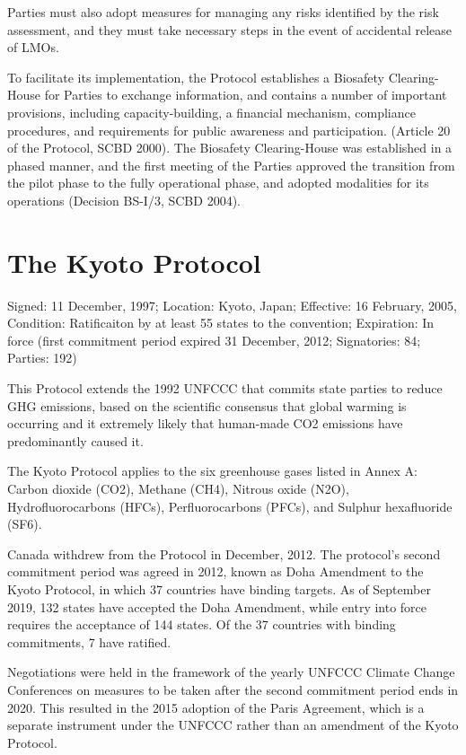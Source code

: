 \documentclass[]{book}
\begin{document}
Parties must also adopt measures for managing any risks identified by the risk assessment, and they must take necessary steps in the event of accidental release of LMOs.

To facilitate its implementation, the Protocol establishes a Biosafety Clearing-House for Parties to exchange information, and contains a number of important provisions, including capacity-building, a financial mechanism, compliance procedures, and requirements for public awareness and participation. (Article 20 of the Protocol, SCBD 2000). The Biosafety Clearing-House was established in a phased manner, and the first meeting of the Parties approved the transition from the pilot phase to the fully operational phase, and adopted modalities for its operations (Decision BS-I/3, SCBD 2004).

\hypertarget{the-kyoto-protocol}{%
\section{The Kyoto Protocol}\label{the-kyoto-protocol}}

Signed: 11 December, 1997; Location: Kyoto, Japan; Effective: 16 February, 2005, Condition: Ratificaiton by at least 55 states to the convention; Expiration: In force (first commitment period expired 31 December, 2012; Signatories: 84; Parties: 192)

This Protocol extends the 1992 UNFCCC that commits state parties to reduce GHG emissions, based on the scientific consensus that global warming is occurring and it extremely likely that human-made CO2 emissions have predominantly caused it.

The Kyoto Protocol applies to the six greenhouse gases listed in Annex A: Carbon dioxide (CO2), Methane (CH4), Nitrous oxide (N2O), Hydrofluorocarbons (HFCs), Perfluorocarbons (PFCs), and Sulphur hexafluoride (SF6).

Canada withdrew from the Protocol in December, 2012. The protocol's second commitment period was agreed in 2012, known as Doha Amendment to the Kyoto Protocol, in which 37 countries have binding targets. As of September 2019, 132 states have accepted the Doha Amendment, while entry into force requires the acceptance of 144 states. Of the 37 countries with binding commitments, 7 have ratified.

Negotiations were held in the framework of the yearly UNFCCC Climate Change Conferences on measures to be taken after the second commitment period ends in 2020. This resulted in the 2015 adoption of the Paris Agreement, which is a separate instrument under the UNFCCC rather than an amendment of the Kyoto Protocol.
\end{document}

